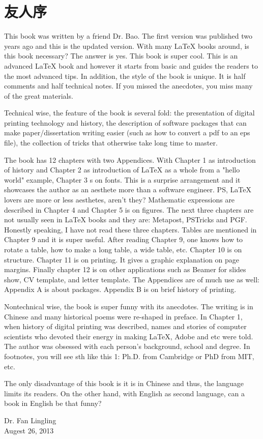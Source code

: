 \chapter{友人序}

This book was written by a friend Dr. Bao. The first version was published two years ago and this is the updated version. With many \LaTeX{} books around, is this book necessary? The answer is yes. This book is super cool. This is an advanced \LaTeX{} book and however it starts from basic and guides the readers to the most advanced tips. In addition, the style of the book is unique. It is half comments and half technical notes. If you missed the anecdotes, you miss many of the great materials.

Technical wise, the feature of the book is several fold: the presentation of digital printing technology and history, the description of software packages that can make paper/dissertation writing easier (such as how to convert a pdf to an eps file), the collection of tricks that otherwise take long time to master.

The book has 12 chapters with two Appendices. With Chapter 1 as introduction of history and Chapter 2 as introduction of \LaTeX{} as a whole from a "hello world" example, Chapter 3 s on fonts. This is a surprise arrangement and it showcases the author as an aesthete more than a software engineer. PS, \LaTeX{} lovers are more or less aesthetes, aren't they? Mathematic expressions are described in Chapter 4 and Chapter 5 is on figures. The next three chapters are not usually seen in \LaTeX{} books and they are: Metapost, PSTricks and PGF. Honestly speaking, I have not read these three chapters. Tables are mentioned in Chapter 9 and it is super useful. After reading Chapter 9, one knows how to rotate a table, how to make a long table, a wide table, etc. Chapter 10 is on structure. Chapter 11 is on printing. It gives a graphic explanation on page margins. Finally chapter 12 is on other applications such as Beamer for slides show, CV template, and letter template. The Appendices are of much use as well: Appendix A is about packages. Appendix B is on brief history of printing.

Nontechnical wise, the book is super funny with its anecdotes. The writing is in Chinese and many historical poems were re-shaped in preface. In Chapter 1, when history of digital printing was described, names and stories of computer scientists who devoted their energy in making \LaTeX{}, Adobe and etc were told. The author was obsessed with each person's background, school and degree. In footnotes, you will see sth like this 1: Ph.D. from Cambridge or PhD from MIT, etc.

The only disadvantage of this book is it is in Chinese and thus, the language limits its readers. On the other hand, with English as second language, can a book in English be that funny?

\begin{flushright}
Dr. Fan Lingling \\
Augest 26, 2013
\end{flushright}
